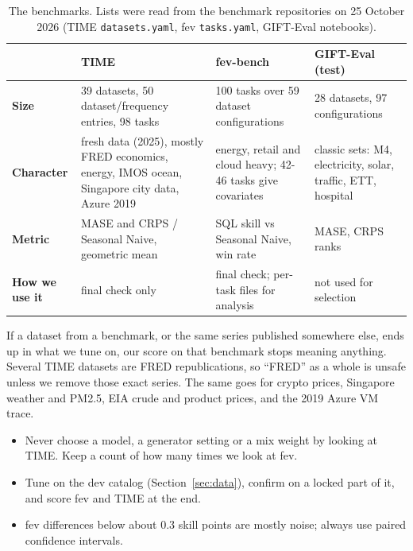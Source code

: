 \documentclass[10pt,a4paper]{article}
\begin{document}
\begin{table}[H]
\centering\small
\begin{tabularx}{\linewidth}{>{\bfseries}l Y Y Y}
\toprule
 & TIME & fev-bench & GIFT-Eval (test) \\
\midrule
Size & 39 datasets, 50 dataset/frequency entries, 98 tasks & 100 tasks over 59 dataset configurations & 28 datasets, 97 configurations \\
Character & fresh data (2025), mostly FRED economics, energy, IMOS ocean, Singapore city data, Azure 2019 & energy, retail and cloud heavy; 42-46 tasks give covariates & classic sets: M4, electricity, solar, traffic, ETT, hospital \\
Metric & MASE and CRPS / Seasonal Naive, geometric mean & SQL skill vs Seasonal Naive, win rate & MASE, CRPS ranks \\
How we use it & final check only & final check; per-task files for analysis & not used for selection \\
\bottomrule
\end{tabularx}
\caption{The benchmarks. Lists were read from the benchmark repositories on 25 October 2026 (TIME \texttt{datasets.yaml}, fev \texttt{tasks.yaml}, GIFT-Eval notebooks).}
\end{table}

\begin{plain}
If a dataset from a benchmark, or the same series published somewhere else, ends up in what we tune on, our score on that benchmark stops meaning anything. Several TIME datasets are FRED republications, so ``FRED'' as a whole is unsafe unless we remove those exact series. The same goes for crypto prices, Singapore weather and PM2.5, EIA crude and product prices, and the 2019 Azure VM trace.
\end{plain}

\begin{keep}
\begin{itemize}
\item Never choose a model, a generator setting or a mix weight by looking at TIME. Keep a count of how many times we look at fev.
\item Tune on the dev catalog (Section~\ref{sec:data}), confirm on a locked part of it, and score fev and TIME at the end.
\item fev differences below about 0.3 skill points are mostly noise; always use paired confidence intervals.
\end{itemize}
\end{keep}
\end{document}
